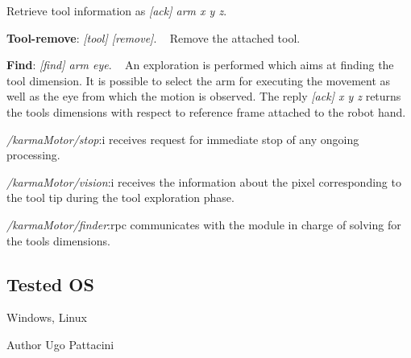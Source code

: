 \begin{DoxyItemize}
\begin{DoxyEnumerate}
 Retrieve tool information as {\itshape \mbox{[}ack\mbox{]} arm x y z}.
\item {\bfseries Tool-\/remove}\+: {\itshape \mbox{[}tool\mbox{]} \mbox{[}remove\mbox{]}}. ~\newline
 Remove the attached tool.
\item {\bfseries Find}\+: {\itshape \mbox{[}find\mbox{]} arm eye}. ~\newline
 An exploration is performed which aims at finding the tool dimension. It is possible to select the arm for executing the movement as well as the eye from which the motion is observed. The reply {\itshape \mbox{[}ack\mbox{]} x y z} returns the tool\textquotesingle{}s dimensions with respect to reference frame attached to the robot hand.
\end{DoxyEnumerate}
\item {\itshape /karma\+Motor/stop}\+:i receives request for immediate stop of any ongoing processing.
\item {\itshape /karma\+Motor/vision}\+:i receives the information about the pixel corresponding to the tool tip during the tool exploration phase.
\item {\itshape /karma\+Motor/finder}\+:rpc communicates with the module in charge of solving for the tool\textquotesingle{}s dimensions.
\end{DoxyItemize}\hypertarget{group__karmaToolProjection_tested_os_sec}{}\subsection{Tested O\+S}\label{group__karmaToolProjection_tested_os_sec}
Windows, Linux

\begin{DoxyAuthor}{Author}
Ugo Pattacini 
\end{DoxyAuthor}
